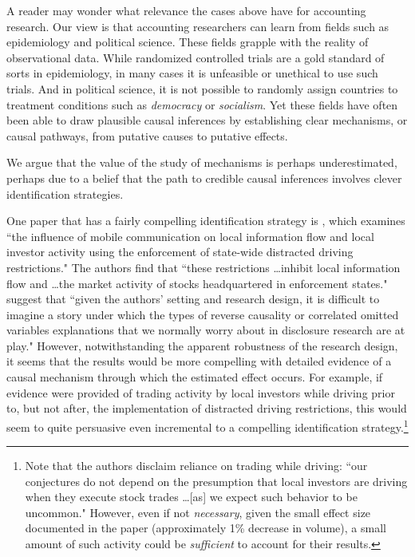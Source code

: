 \documentclass[11pt,reqno]{amsart}
\begin{document}
A reader may wonder what relevance the cases above have for accounting research.
Our view is that accounting researchers can learn from fields such as epidemiology and political science. 
These fields grapple with the reality of observational data.
While randomized controlled trials are a gold standard of sorts in epidemiology, in many cases it is unfeasible or unethical to use such trials.
And in political science, it is not possible to randomly assign countries to treatment conditions such as \emph{democracy} or \emph{socialism}.
Yet these fields have often been able to draw plausible causal inferences by establishing clear mechanisms, or causal pathways, from putative causes to putative effects.

We argue that the value of the study of mechanisms is perhaps underestimated, perhaps due to a belief that the path to credible causal inferences involves clever identification strategies.

One paper that has a fairly compelling identification strategy is \citet{Brown:2015ik}, which examines ``the influence of mobile communication on local information flow and local investor activity using the enforcement of state-wide distracted driving restrictions."
The authors find that ``these restrictions \dots inhibit local information flow and \dots the market activity of stocks headquartered in enforcement states."
\citet[p.\,9]{Miller:2015ec} suggest that ``given the authors' setting and research design, it is difficult to imagine a story under which the types of reverse causality or correlated omitted variables explanations that we normally worry about in disclosure research are at play."
However, notwithstanding the apparent robustness of the research design, it seems that the results would be more compelling with detailed evidence of a causal mechanism through which the estimated  effect occurs.
For example, if evidence were provided of trading activity by local investors while driving prior to, but not after, the implementation of distracted driving restrictions, this would seem to quite persuasive even incremental to a compelling identification strategy.\footnote{
Note that the authors disclaim reliance on trading while driving: ``our conjectures do not depend on the presumption that local investors are driving when they execute stock trades \dots [as] we expect such behavior to be uncommon."
However, even if not \emph{necessary}, given the small effect size documented in the paper (approximately 1\% decrease in volume), a small amount of such activity could be \emph{sufficient} to account for their results.}
\end{document}
